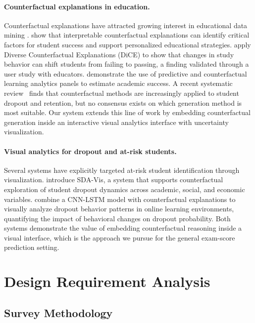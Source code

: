 \documentclass[11pt]{article}
\begin{document}
\paragraph{Counterfactual explanations in education.}
Counterfactual explanations have attracted growing interest in educational data mining \cite{bunay2026}. \citet{tsiakmaki2021} show that interpretable counterfactual explanations can identify critical factors for student success and support personalized educational strategies. \citet{afrin2023} apply Diverse Counterfactual Explanations (DiCE) to show that changes in study behavior can shift students from failing to passing, a finding validated through a user study with educators. \citet{susnjak2022} demonstrate the use of predictive and counterfactual learning analytics panels to estimate academic success. A recent systematic review~\cite{bunay2026} finds that counterfactual methods are increasingly applied to student dropout and retention, but no consensus exists on which generation method is most suitable. Our system extends this line of work by embedding counterfactual generation inside an interactive visual analytics interface with uncertainty visualization.

\paragraph{Visual analytics for dropout and at-risk students.}
Several systems have explicitly targeted at-risk student identification through visualization. \citet{sdavis2022} introduce SDA-Vis, a system that supports counterfactual exploration of student dropout dynamics across academic, social, and economic variables. \citet{zhang2023} combine a CNN-LSTM model with counterfactual explanations to visually analyze dropout behavior patterns in online learning environments, quantifying the impact of behavioral changes on dropout probability. Both systems demonstrate the value of embedding counterfactual reasoning inside a visual interface, which is the approach we pursue for the general exam-score prediction setting.

\section{Design Requirement Analysis}
\label{sec:requirements}

\subsection{Survey Methodology}
\end{document}

